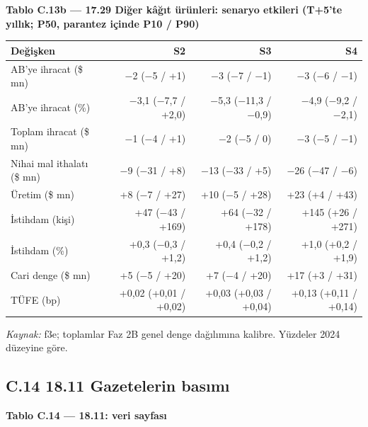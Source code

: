 \endgroup


\textbf{Tablo C.13b --- 17.29 Diğer kâğıt ürünleri: senaryo etkileri (T+5'te yıllık; P50, parantez içinde P10 / P90)}

\nopagebreak[4]

\begingroup\gbtablo\small

\begin{longtable}[]{@{}lrrr@{}}
\toprule\noalign{}
\textbf{Değişken} & \textbf{S2} & \textbf{S3} & \textbf{S4} \\
\midrule\noalign{}
\endhead
\bottomrule\noalign{}
\endlastfoot
AB'ye ihracat (\$ mn) & −2 (−5 / +1) & −3 (−7 / −1) & −3 (−6 / −1) \\
AB'ye ihracat (\%) & −3,1 (−7,7 / +2,0) & −5,3 (−11,3 / −0,9) & −4,9 (−9,2 / −2,1) \\
Toplam ihracat (\$ mn) & −1 (−4 / +1) & −2 (−5 / 0) & −3 (−5 / −1) \\
Nihai mal ithalatı (\$ mn) & −9 (−31 / +8) & −13 (−33 / +5) & −26 (−47 / −6) \\
Üretim (\$ mn) & +8 (−7 / +27) & +10 (−5 / +28) & +23 (+4 / +43) \\
İstihdam (kişi) & +47 (−43 / +169) & +64 (−32 / +178) & +145 (+26 / +271) \\
İstihdam (\%) & +0,3 (−0,3 / +1,2) & +0,4 (−0,2 / +1,2) & +1,0 (+0,2 / +1,9) \\
Cari denge (\$ mn) & +5 (−5 / +20) & +7 (−4 / +20) & +17 (+3 / +31) \\
TÜFE (bp) & +0,02 (+0,01 / +0,02) & +0,03 (+0,03 / +0,04) & +0,13 (+0,11 / +0,14) \\
\end{longtable}

\endgroup

\emph{Kaynak:} \etiketT{} f3e; toplamlar Faz 2B genel denge dağılımına kalibre. Yüzdeler 2024 düzeyine göre.

\hypertarget{nace_kartlar_16-18-c14-1811-gazetelerin-basux131mux131}{%
\subsection{C.14 18.11 Gazetelerin basımı}\label{nace_kartlar_16-18-c14-1811-gazetelerin-basux131mux131}}


\textbf{Tablo C.14 --- 18.11: veri sayfası}

\nopagebreak[4]

\begingroup\gbtablo\small

